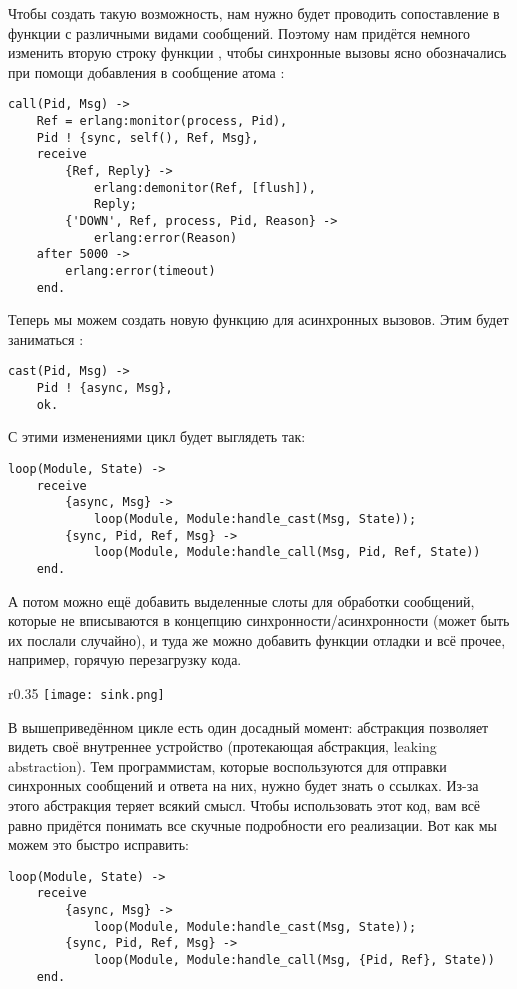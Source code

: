 Чтобы создать такую возможность, нам нужно будет проводить сопоставление  в функции  с различными видами сообщений.
Поэтому нам придётся немного изменить вторую строку функции , чтобы синхронные вызовы ясно обозначались при помощи добавления в сообщение атома :
\begin{lstlisting}[style=erlang]
call(Pid, Msg) ->
    Ref = erlang:monitor(process, Pid),
    Pid ! {sync, self(), Ref, Msg},
    receive
        {Ref, Reply} ->
            erlang:demonitor(Ref, [flush]),
            Reply;
        {'DOWN', Ref, process, Pid, Reason} ->
            erlang:error(Reason)
    after 5000 ->
        erlang:error(timeout)
    end.
\end{lstlisting}

Теперь мы можем создать новую функцию для асинхронных вызовов.
Этим будет заниматься :
\begin{lstlisting}[style=erlang]
cast(Pid, Msg) ->
    Pid ! {async, Msg},
    ok.
\end{lstlisting}
С этими изменениями цикл будет выглядеть так:
\begin{lstlisting}[style=erlang]
loop(Module, State) ->
    receive
        {async, Msg} ->
            loop(Module, Module:handle_cast(Msg, State));
        {sync, Pid, Ref, Msg} ->
            loop(Module, Module:handle_call(Msg, Pid, Ref, State))
    end.
\end{lstlisting}
А потом можно ещё добавить выделенные слоты для обработки сообщений, которые не вписываются в концепцию синхронности/асинхронности (может быть их послали случайно), и туда же можно добавить функции отладки и всё прочее, например, горячую перезагрузку кода.
\begin{wrapfigure}{r}{0.35\linewidth}
    \texttt{[image: sink.png]}
\end{wrapfigure}

В вышеприведённом цикле есть один досадный момент: абстракция позволяет видеть своё внутреннее устройство (протекающая абстракция, leaking abstraction).
Тем программистам, которые воспользуются  для отправки синхронных сообщений и ответа на них, нужно будет знать о ссылках.
Из\--за этого абстракция теряет всякий смысл.
Чтобы использовать этот код, вам всё равно придётся понимать все скучные подробности его реализации.
Вот как мы можем это быстро исправить:
\begin{lstlisting}[style=erlang]
loop(Module, State) ->
    receive
        {async, Msg} ->
            loop(Module, Module:handle_cast(Msg, State));
        {sync, Pid, Ref, Msg} ->
            loop(Module, Module:handle_call(Msg, {Pid, Ref}, State))
    end.
\end{lstlisting}

